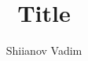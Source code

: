 \documentclass{beamer}
\title{Title}
\author{Shiianov Vadim}
\begin{document}
\begin{frame}
    \titlepage
\end{frame}
\end{document}
